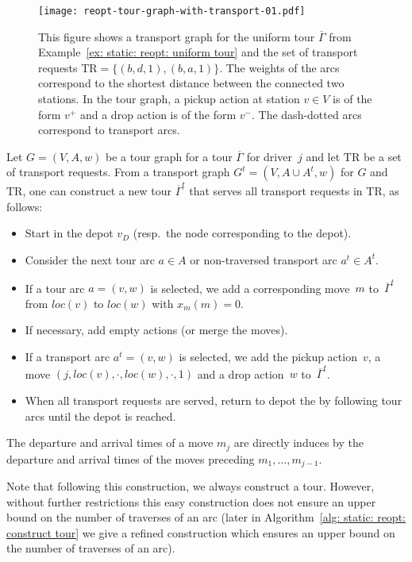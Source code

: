 \documentclass[english]{llncs}
\numberwithin{sublemma}{lemma}
\newcommand{\aloc}{\ensuremath{loc}}
\newcommand{\loadd}{\ensuremath{x_m}}
\newcommand{\tourd}{\ensuremath{\Gamma}}
\newcommand{\move}{\ensuremath{m}}
\newcommand{\TR}{\mathrm{TR}}
\begin{document}
\begin{figure}[ht]
    \centering
    \texttt{[image: reopt-tour-graph-with-transport-01.pdf]}
 \caption{
  This figure shows a transport graph for the uniform tour $\overline{\tourd}$ from Example~\ref{ex: static: reopt: uniform tour} and the set of transport requests
  $\TR = \{ (b, d, 1), (b, a, 1) \}$.
  The weights of the arcs correspond to the shortest distance between the connected two stations.
  In the tour graph, a pickup action at station $v \in V$ is of the form $v^+$ and a drop action is of the form $v^-$.
  The dash-dotted arcs correspond to transport arcs.
 }
 \label{fig: static: reopt: transport graph}
\end{figure}



\begin{remark}\label{rem: static: reopt: construct tour from transport graph}
Let $G = (V, A, w)$ be a tour graph for a tour $\overline{\tourd}$ for driver~$j$ and let $\TR$ be a set of transport requests.
From a transport graph $G^t = (V, A \cup A^t, w)$ for $G$ and $\TR$, one can construct a new tour $\overline{\tourd}^t$ that serves all transport requests in $\TR$, as follows:
\begin{itemize}
 \item Start in the depot $v_D$ (resp.~the node corresponding to the depot).
 \item Consider the next tour arc $a \in A$ or non-traversed transport arc $a^t \in A^t$.
 \item If a tour arc $a = (v, w)$ is selected, we add a corresponding move~$m$ to~$\overline{\tourd}^t$ from $\aloc(v)$ to $\aloc(w)$ with $\loadd(m) = 0$.
 \item If necessary, add empty actions (or merge the moves).
 \item If a transport arc $a^t = (v, w)$ is selected, we add the pickup action~$v$, a move $(j, \aloc(v), \cdot, \aloc(w), \cdot, 1)$ and a drop action~$w$ to~$\overline{\tourd}^t$.
 \item When all transport requests are served, return to depot the by following tour arcs until the depot is reached.
\end{itemize}
The departure and arrival times of a move $\move_j$ are directly induces by the departure and arrival times of the moves preceding $\move_1, \dotsc, \move_{j-1}$.

Note that following this construction, we always construct a tour.
However, without further restrictions
this easy construction
does not ensure an upper bound on the number of traverses of an arc
(later in Algorithm~\ref{alg: static: reopt: construct tour} we give a refined construction which ensures an upper bound on the number of traverses of an arc).
\end{remark}
\end{document}
